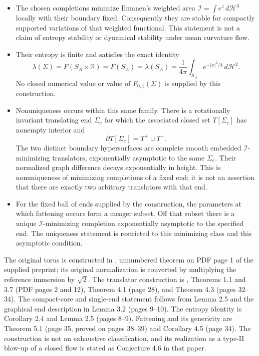 \begin{example}
\begin{itemize}
\[\]
counted with multiplicity. The translating ends have an $I_A$-parameter construction, indexed by a ball in $\mathbb R^{I_A}$ for each sufficiently large cutoff. No exact numerical value of $I_A$ is needed here. These parameters include ambient translations; they are not a count of parameters after quotienting by rigid motions. The completions need not form a smooth or single-valued family across a fattening parameter. A rotationally invariant subfamily can be chosen.
\item The chosen completions minimize Ilmanen's weighted area $\mathcal I=\int e^z\,d\mathcal H^3$ locally with their boundary fixed. Consequently they are stable for compactly supported variations of that weighted functional. This statement is not a claim of entropy stability or dynamical stability under mean curvature flow.
\item Their entropy is finite and satisfies the exact identity
\[
 \lambda(\Sigma)=F(S_A\times\mathbb R)=F(S_A)=\lambda(S_A)
 =\frac1{4\pi}\int_{S_A}e^{-|x|^2/4}\,d\mathcal H^2.
\]
No closed numerical value or value of $F_{0,1}(\Sigma)$ is supplied by this construction.
\item Nonuniqueness occurs within this same family. There is a rotationally invariant translating end $\Sigma_e$ for which the associated closed set $T[\Sigma_e]$ has nonempty interior and
\[
 \partial T[\Sigma_e]=T^+\sqcup T^-.
\]
The two distinct boundary hypersurfaces are complete smooth embedded $\mathcal I$-minimizing translators, exponentially asymptotic to the same $\Sigma_e$. Their normalized graph difference decays exponentially in height. This is nonuniqueness of minimizing completions of a fixed end; it is not an assertion that there are exactly two arbitrary translators with that end.
\item For the fixed ball of ends supplied by the construction, the parameters at which fattening occurs form a meager subset. Off that subset there is a unique $\mathcal I$-minimizing completion exponentially asymptotic to the specified end. The uniqueness statement is restricted to this minimizing class and this asymptotic condition.
\end{itemize}
The original torus is constructed in \cite{CatAngenent1992}, unnumbered theorem on PDF page 1 of the supplied preprint; its original normalization is converted by multiplying the reference immersion by $\sqrt2$. The translator construction is \cite{CatSunWang2025}, Theorems 1.1 and 3.7 (PDF pages 2 and 12), Theorem 4.1 (page 28), and Theorem 4.3 (pages 32--34). The compact-core and single-end statement follows from Lemma 2.5 and the graphical end description in Lemma 3.2 (pages 9--10). The entropy identity is Corollary 2.4 and Lemma 2.5 (pages 8--9). Fattening and its genericity are Theorem 5.1 (page 35, proved on pages 38--39) and Corollary 4.5 (page 34). The construction is not an exhaustive classification, and its realization as a type-II blow-up of a closed flow is stated as Conjecture 4.6 in that paper.
\end{example}

